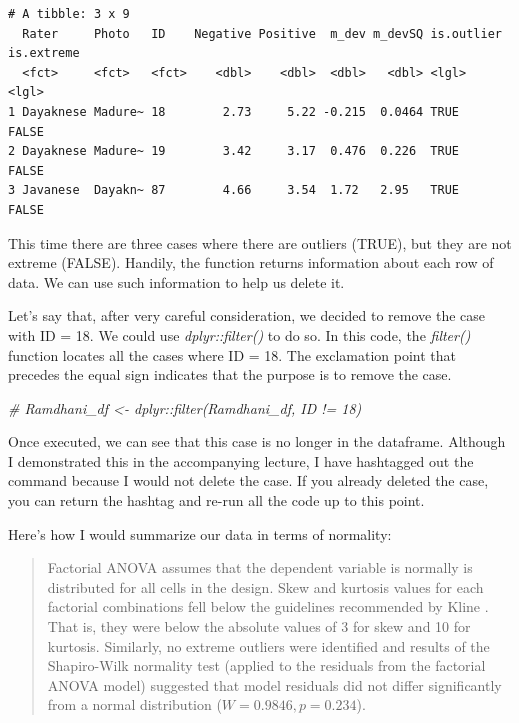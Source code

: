 \documentclass[
  11pt,
]{book}
\newenvironment{Shaded}{\begin{snugshade}}{\end{snugshade}}
\newcommand{\CommentTok}[1]{\textcolor[rgb]{0.37,0.37,0.37}{\textit{#1}}}
\begin{document}
\begin{verbatim}
# A tibble: 3 x 9
  Rater     Photo   ID    Negative Positive  m_dev m_devSQ is.outlier is.extreme
  <fct>     <fct>   <fct>    <dbl>    <dbl>  <dbl>   <dbl> <lgl>      <lgl>     
1 Dayaknese Madure~ 18        2.73     5.22 -0.215  0.0464 TRUE       FALSE     
2 Dayaknese Madure~ 19        3.42     3.17  0.476  0.226  TRUE       FALSE     
3 Javanese  Dayakn~ 87        4.66     3.54  1.72   2.95   TRUE       FALSE     
\end{verbatim}

This time there are three cases where there are outliers (TRUE), but they are not extreme (FALSE). Handily, the function returns information about each row of data. We can use such information to help us delete it.

Let's say that, after very careful consideration, we decided to remove the case with ID = 18. We could use \emph{dplyr::filter()} to do so. In this code, the \emph{filter()} function locates all the cases where ID = 18. The exclamation point that precedes the equal sign indicates that the purpose is to remove the case.

\begin{Shaded}
\begin{Highlighting}[]
\CommentTok{\# Ramdhani\_df \textless{}{-} dplyr::filter(Ramdhani\_df, ID != \textquotesingle{}18\textquotesingle{})}
\end{Highlighting}
\end{Shaded}

Once executed, we can see that this case is no longer in the dataframe. Although I demonstrated this in the accompanying lecture, I have hashtagged out the command because I would not delete the case. If you already deleted the case, you can return the hashtag and re-run all the code up to this point.

Here's how I would summarize our data in terms of normality:

\begin{quote}
Factorial ANOVA assumes that the dependent variable is normally is distributed for all cells in the design. Skew and kurtosis values for each factorial combinations fell below the guidelines recommended by Kline \citeyearpar{kline_data_2016}. That is, they were below the absolute values of 3 for skew and 10 for kurtosis. Similarly, no extreme outliers were identified and results of the Shapiro-Wilk normality test (applied to the residuals from the factorial ANOVA model) suggested that model residuals did not differ significantly from a normal distribution (\(W = 0.9846, p = 0.234\)).
\end{quote}
\end{document}
